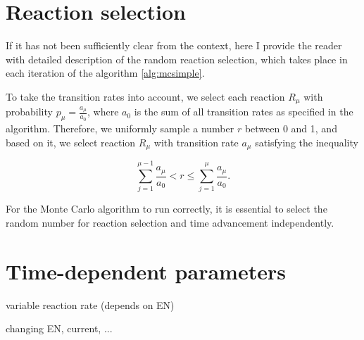 \section{Reaction selection}

If it has not been sufficiently clear from the context, here I provide the reader with detailed description of the random reaction selection, which takes place in each iteration of the algorithm \ref{alg:mcsimple}. 

To take the transition rates into account, we select each reaction $R_\mu$ with probability $p_\mu = \frac{a_\mu}{a_0}$, where $a_0$ is the sum of all transition rates as specified in the algorithm. Therefore, we uniformly sample a number $r$ between 0 and 1, and based on it, we select reaction $R_\mu$ with transition rate $a_\mu$ satisfying the inequality 

$$
\sum_{j = 1}^{\mu - 1}\frac{a_\mu}{a_0} < r \leq \sum_{j = 1}^{\mu}\frac{a_\mu}{a_0}.
$$ 

For the Monte Carlo algorithm to run correctly, it is essential to select the random number for reaction selection and time advancement independently. 

\section{Time-dependent parameters}

variable reaction rate (depends on EN)

changing EN, current, ...
